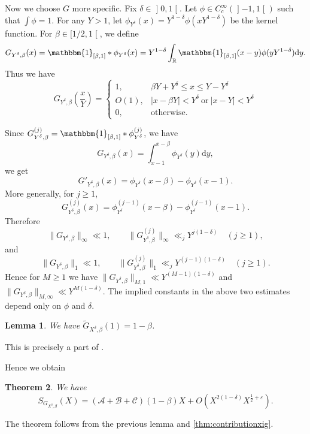 \documentclass[10pt,oneside,reqno]{amsart}
\makeatletter
\newcommand\lopen{\mathopen{]}}
\newcommand\ropen{\mathclose{[}}
\newcommand\rmd{\mathrm{d}}
\newcommand\RR{\mathbb{R}}
\newcommand\ms[1]{\mathscr{#1}}
\newcommand\triv{\mathbbm{1}}
\renewcommand\leq{\leqslant}
\renewcommand\geq{\geqslant}
\newcommand\legendresymbol[2]{\genfrac{(}{)}{}{}{#1}{#2}}
\theoremstyle{THEOREM}
\newtheorem{theorem}{Theorem}[section]
\newtheorem{lemma}[theorem]{Lemma}
\theoremstyle{DEFINITION}
\theoremstyle{EXERCISE}
\numberwithin{equation}{section}
\renewenvironment{proof}[1][\proofname]{\par
  \vspace{-6pt}
  \pushQED{\qed}
  \normalfont \topsep6\p@\@plus6\p@\relax
  \trivlist
  \item[\hskip\labelsep\rmfamily\bfseries
    #1\@addpunct{:}]\ignorespaces
}{
  \popQED\endtrivlist\@endpefalse
  \vspace{-6pt}
}
\makeatother
\begin{document}
Now we choose $G$ more specific. Fix $\delta\in \lopen 0,1\ropen$. Let $\phi\in C_c^\infty(\lopen -1,1\ropen)$ such that $\int\phi=1$. For any $Y>1$, let $\phi_{Y^\delta}(x)=Y^{1-\delta}\phi(xY^{1-\delta})$ be the kernel function. For $\beta\in [1/2,1\ropen$, we define
\[
G_{Y^\delta,\beta}(x)=\triv_{[\beta,1]}* \phi_{Y^\delta}(x)=Y^{1-\delta}\int_{\RR}\triv_{[\beta,1]}(x-y) \phi(yY^{1-\delta})\rmd y.
\]
Thus we have
\begin{equation}\label{eq:propertyconvolution}
G_{Y^\delta,\beta}\legendresymbol{x}{Y}=\begin{cases}
                                          1, & \beta Y+Y^\delta\leq x\leq Y-Y^\delta \\
                                          O(1), & |x-\beta Y|<Y^\delta\ \text{or}\ |x-Y|<Y^\delta\\
                                          0,&\text{otherwise}.
                                        \end{cases}
\end{equation}

Since $G_{Y^\delta,\beta}^{(j)}=\triv_{[\beta,1]}* \phi_{Y^\delta}^{(j)}$, we have
\[
G_{Y^\delta,\beta}(x)=\int_{x-1}^{x-\beta}\phi_{Y^\delta}(y)\rmd y,
\]
we get
\[
  G'_{Y^\delta,\beta}(x)
  =\phi_{Y^\delta}(x-\beta)-\phi_{Y^\delta}(x-1).
\]
More generally, for \(j\ge 1\),
\[
  G_{Y^\delta,\beta}^{(j)}(x)
  =\phi_{Y^\delta}^{(j-1)}(x-\beta)
   -\phi_{Y^\delta}^{(j-1)}(x-1).
\]
Therefore
\[
  \|G_{Y^\delta,\beta}\|_\infty\ll 1,\qquad
  \|G_{Y^\delta,\beta}^{(j)}\|_\infty
  \ll_j Y^{j(1-\delta)}\quad (j\geq1),
\]
and
\[
  \|G_{Y^\delta,\beta}\|_1\ll 1,\qquad
  \|G_{Y^\delta,\beta}^{(j)}\|_1
  \ll_j Y^{(j-1)(1-\delta)}\quad (j\geq1).
\]
Hence for $M\geq 1$ we have $\|G_{Y^\delta,\beta}\|_{M,1}\ll Y^{(M-1)(1-\delta)}$ and $\|G_{Y^\delta,\beta}\|_{M,\infty}\ll Y^{M(1-\delta)}$.
The implied constants in the above two estimates depend only on $\phi$ and $\delta$.

\begin{lemma}
We have $\widetilde{G}_{X^\delta,\beta}(1)=1-\beta$.
\end{lemma}
\begin{proof}
This is precisely a part of \cite[Lemma 7.11]{cheng2025c}.
\end{proof}
Hence we obtain
\begin{theorem}\label{thm:contributionxigfinal}
We have
\[
S_{G_{X^\delta,\beta}}(X)=(\ms{A}+\ms{B}+\ms{C})(1-\beta)X+O(X^{2(1-\delta)}X^{\frac12+\varepsilon}).
\]
\end{theorem}
\begin{proof}
The theorem follows from the previous lemma and \autoref{thm:contributionxig}.
\end{proof}
\end{document}
